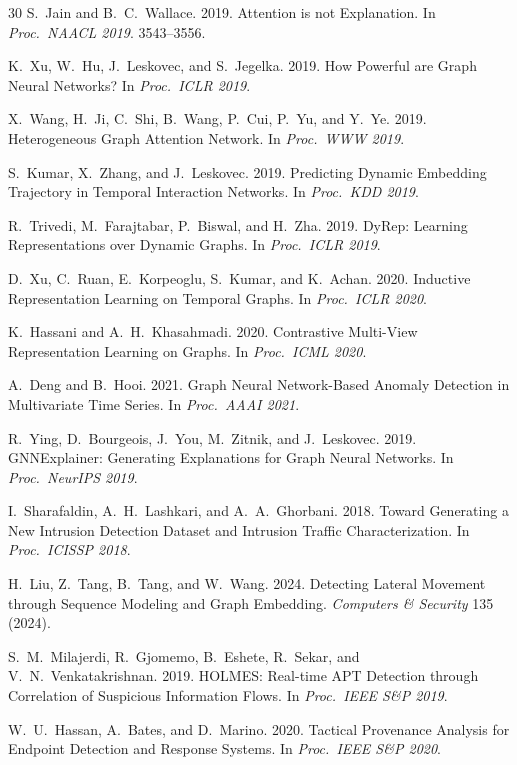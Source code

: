 \documentclass[sigconf,nonacm]{acmart}
\begin{document}
\begin{thebibliography}{30}
S.~Jain and B.~C.~Wallace. 2019. Attention is not Explanation.
In \textit{Proc.\ NAACL 2019}. 3543--3556.

K.~Xu, W.~Hu, J.~Leskovec, and S.~Jegelka. 2019. How Powerful are Graph
Neural Networks? In \textit{Proc.\ ICLR 2019}.

X.~Wang, H.~Ji, C.~Shi, B.~Wang, P.~Cui, P.~Yu, and Y.~Ye. 2019.
Heterogeneous Graph Attention Network. In \textit{Proc.\ WWW 2019}.

S.~Kumar, X.~Zhang, and J.~Leskovec. 2019. Predicting Dynamic Embedding
Trajectory in Temporal Interaction Networks. In \textit{Proc.\ KDD 2019}.

R.~Trivedi, M.~Farajtabar, P.~Biswal, and H.~Zha. 2019. DyRep: Learning
Representations over Dynamic Graphs. In \textit{Proc.\ ICLR 2019}.

D.~Xu, C.~Ruan, E.~Korpeoglu, S.~Kumar, and K.~Achan. 2020. Inductive
Representation Learning on Temporal Graphs. In \textit{Proc.\ ICLR 2020}.

K.~Hassani and A.~H.~Khasahmadi. 2020. Contrastive Multi-View Representation
Learning on Graphs. In \textit{Proc.\ ICML 2020}.

A.~Deng and B.~Hooi. 2021. Graph Neural Network-Based Anomaly Detection in
Multivariate Time Series. In \textit{Proc.\ AAAI 2021}.

R.~Ying, D.~Bourgeois, J.~You, M.~Zitnik, and J.~Leskovec. 2019.
GNNExplainer: Generating Explanations for Graph Neural Networks.
In \textit{Proc.\ NeurIPS 2019}.

I.~Sharafaldin, A.~H.~Lashkari, and A.~A.~Ghorbani. 2018. Toward Generating
a New Intrusion Detection Dataset and Intrusion Traffic Characterization.
In \textit{Proc.\ ICISSP 2018}.

H.~Liu, Z.~Tang, B.~Tang, and W.~Wang. 2024. Detecting Lateral Movement
through Sequence Modeling and Graph Embedding. \textit{Computers \& Security}
135 (2024).

S.~M.~Milajerdi, R.~Gjomemo, B.~Eshete, R.~Sekar, and V.~N.~Venkatakrishnan.
2019. HOLMES: Real-time APT Detection through Correlation of Suspicious
Information Flows. In \textit{Proc.\ IEEE S\&P 2019}.

W.~U.~Hassan, A.~Bates, and D.~Marino. 2020. Tactical Provenance Analysis
for Endpoint Detection and Response Systems. In \textit{Proc.\ IEEE S\&P 2020}.

\end{thebibliography}
\end{document}
